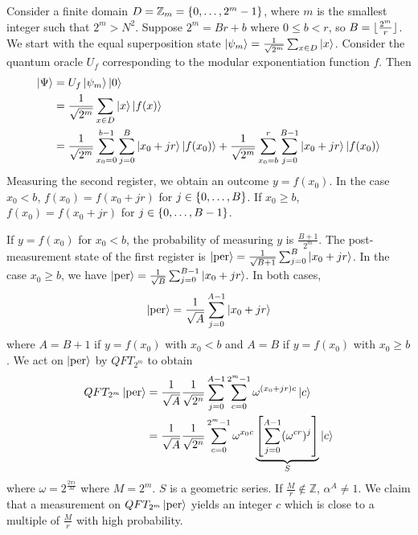 Consider a finite domain \( D = \mathbb Z_m = \qty{0, \dots, 2^m - 1} \), where \( m \) is the smallest integer such that \( 2^m > N^2 \).
Suppose \( 2^m = Br + b \) where \( 0 \leq b < r \), so \( B = \lfloor\frac{2^m}{r}\rfloor \).
We start with the equal superposition state \( \ket{\psi_m} = \frac{1}{\sqrt{2^m}} \sum_{x \in D} \ket{x} \).
Consider the quantum oracle \( U_f \) corresponding to the modular exponentiation function \( f \).
Then
\begin{align*}
    \ket{\Psi} &= U_f \ket{\psi_m} \ket{0} \\
    &= \frac{1}{\sqrt{2^m}} \sum_{x \in D} \ket{x} \ket{f(x)} \\
    &= \frac{1}{\sqrt{2^m}} \sum_{x_0 = 0}^{b-1} \sum_{j=0}^B \ket{x_0 + jr} \ket{f(x_0)} + \frac{1}{\sqrt{2^m}} \sum_{x_0 = b}^r \sum_{j=0}^{B-1} \ket{x_0 + jr}\ket{f(x_0)}
\end{align*}
Measuring the second register, we obtain an outcome \( y = f(x_0) \).
In the case \( x_0 < b \), \( f(x_0) = f(x_0 + jr) \) for \( j \in \qty{0, \dots, B} \).
If \( x_0 \geq b \), \( f(x_0) = f(x_0 + jr) \) for \( j \in \qty{0, \dots, B - 1} \).

If \( y = f(x_0) \) for \( x_0 < b \), the probability of measuring \( y \) is \( \frac{B+1}{2^m} \).
The post-measurement state of the first register is \( \ket{\mathrm{per}} = \frac{1}{\sqrt{B+1}} \sum_{j=0}^B \ket{x_0 + jr} \).
In the case \( x_0 \geq b \), we have \( \ket{\mathrm{per}} = \frac{1}{\sqrt{B}} \sum_{j=0}^{B-1} \ket{x_0 + jr} \).
In both cases,
\[ \ket{\mathrm{per}} = \frac{1}{\sqrt{A}} \sum_{j=0}^{A-1} \ket{x_0 + jr} \]
where \( A = B+1 \) if \( y = f(x_0) \) with \( x_0 < b \) and \( A = B \) if \( y = f(x_0) \) with \( x_0 \geq b \).
We act on \( \ket{\mathrm{per}} \) by \( QFT_{2^m} \) to obtain
\begin{align*}
    QFT_{2^m} \ket{\mathrm{per}} &= \frac{1}{\sqrt{A}} \frac{1}{\sqrt{2^n}} \sum_{j = 0}^{A-1} \sum_{c=0}^{2^m - 1} \omega^{(x_0 + jr)c}\ket{c} \\
    &=  \frac{1}{\sqrt{A}} \frac{1}{\sqrt{2^n}} \sum_{c=0}^{2^m - 1} \omega^{x_0 c} \underbrace{\qty[\sum_{j = 0}^{A-1} (\omega^{cr})^j]}_{S} \ket{c} \\
\end{align*}
where \( \omega = 2^{\frac{2\pi i}{M}} \) where \( M = 2^m \).
\( S \) is a geometric series.
If \( \frac{M}{r} \not\in \mathbb Z \), \( \alpha^A \neq 1 \).
We claim that a measurement on \( QFT_{2^m} \ket{\mathrm{per}} \) yields an integer \( c \) which is close to a multiple of \( \frac{M}{r} \) with high probability.

